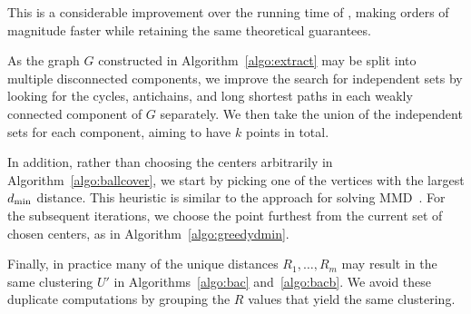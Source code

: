 This is a considerable improvement over the running time of
\algbac{}, making \algbacf{} orders of magnitude faster while retaining the same theoretical guarantees.


As the graph $G$ constructed in Algorithm~\ref{algo:extract} may be split into multiple disconnected components, we improve the search for independent sets by looking for the cycles, antichains, and long shortest paths in each weakly connected component of $G$ separately. We then take the union of the independent sets for each component, aiming to have $k$ points in total.

In addition, rather than choosing the centers arbitrarily in Algorithm~\ref{algo:ballcover}, we start by picking one of the vertices with the largest $d_{\text{min}}$ distance. This heuristic is similar to the approach for solving MMD~\citep{ravi1994heuristic}. For the subsequent iterations, we choose the point furthest from the current set of chosen centers, as in Algorithm~\ref{algo:greedydmin}.

Finally, in practice many of the unique distances $R_1, \ldots, R_m$ may result in the same clustering ${U}'$ in Algorithms~\ref{algo:bac} and~\ref{algo:bacb}. We avoid these duplicate computations by grouping the $R$ values that yield the same clustering.
